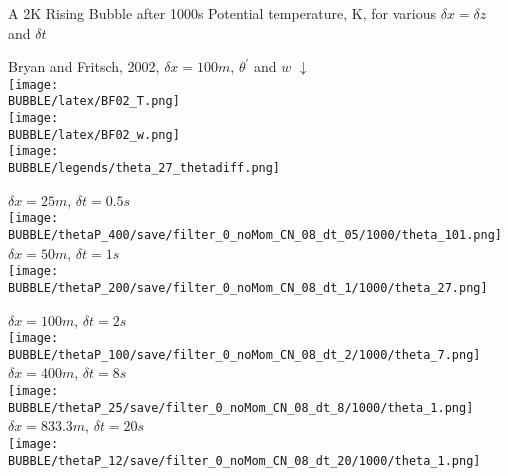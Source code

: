 \begin{slide}
{
    A 2K Rising Bubble after 1000s
    \normalfont\normalsize
    Potential temperature, K, for various $\delta x = \delta z$ and $\delta t$
}

\renewcommand{\figWidth}{0.32\linewidth}

\begin{minipage}[t]{\figWidth}\centering
Bryan and Fritsch, 2002, $\delta x = 100m$, $\theta^\prime$ and $w$ $\downarrow$
\\
\texttt{[image: \\BUBBLE/latex/BF02\_T.png]} \\
\texttt{[image: \\BUBBLE/latex/BF02\_w.png]} \\
\texttt{[image: \\BUBBLE/legends/theta\_27\_thetadiff.png]}
\end{minipage}
%
\begin{minipage}[t]{\figWidth}\centering
$\delta x = 25m$, $\delta t = 0.5s$ \\
\texttt{[image: \\BUBBLE/thetaP\_400/save/filter\_0\_noMom\_CN\_08\_dt\_05/1000/theta\_101.png]}
\\
$\delta x = 50m$, $\delta t = 1s$ \\
\texttt{[image: \\BUBBLE/thetaP\_200/save/filter\_0\_noMom\_CN\_08\_dt\_1/1000/theta\_27.png]}
\end{minipage}
%
\begin{minipage}[t]{\figWidth}\centering
$\delta x = 100m$, $\delta t = 2s$ \\
\texttt{[image: \\BUBBLE/thetaP\_100/save/filter\_0\_noMom\_CN\_08\_dt\_2/1000/theta\_7.png]}
\\
$\delta x = 400m$, $\delta t = 8s$ \\
\texttt{[image: \\BUBBLE/thetaP\_25/save/filter\_0\_noMom\_CN\_08\_dt\_8/1000/theta\_1.png]}
%
$\delta x = 833.3m$, $\delta t = 20s$ \\
\texttt{[image: \\BUBBLE/thetaP\_12/save/filter\_0\_noMom\_CN\_08\_dt\_20/1000/theta\_1.png]}
\end{minipage}

\end{slide}

